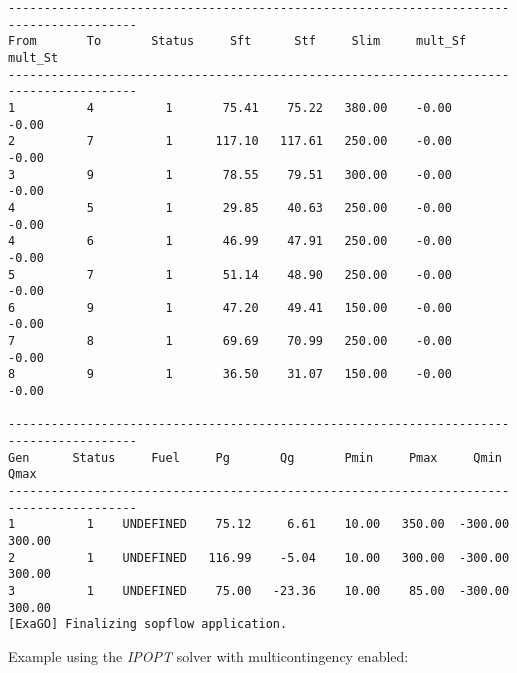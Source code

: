 \begin{lstlisting}
----------------------------------------------------------------------------------------
From       To       Status     Sft      Stf     Slim     mult_Sf  mult_St 
----------------------------------------------------------------------------------------
1          4          1       75.41    75.22   380.00    -0.00    -0.00
2          7          1      117.10   117.61   250.00    -0.00    -0.00
3          9          1       78.55    79.51   300.00    -0.00    -0.00
4          5          1       29.85    40.63   250.00    -0.00    -0.00
4          6          1       46.99    47.91   250.00    -0.00    -0.00
5          7          1       51.14    48.90   250.00    -0.00    -0.00
6          9          1       47.20    49.41   150.00    -0.00    -0.00
7          8          1       69.69    70.99   250.00    -0.00    -0.00
8          9          1       36.50    31.07   150.00    -0.00    -0.00

----------------------------------------------------------------------------------------
Gen      Status     Fuel     Pg       Qg       Pmin     Pmax     Qmin     Qmax  
----------------------------------------------------------------------------------------
1          1    UNDEFINED    75.12     6.61    10.00   350.00  -300.00   300.00
2          1    UNDEFINED   116.99    -5.04    10.00   300.00  -300.00   300.00
3          1    UNDEFINED    75.00   -23.36    10.00    85.00  -300.00   300.00
[ExaGO] Finalizing sopflow application.
\end{lstlisting}

Example using the \emph{IPOPT} solver with multicontingency enabled:

